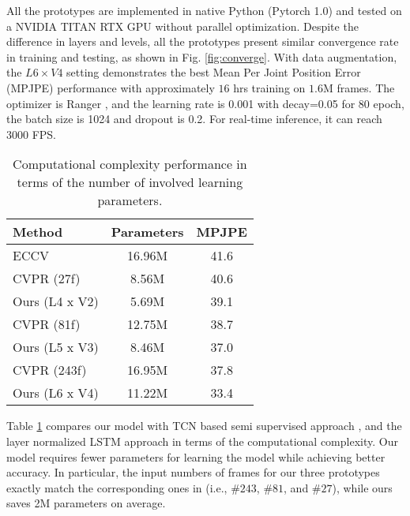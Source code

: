 \documentclass[twocolumn]{svjour3}          \smartqed  \usepackage{graphicx}
\begin{document}
All the prototypes are implemented in native Python (Pytorch 1.0) and tested on a NVIDIA TITAN RTX GPU  without parallel optimization. Despite the difference in layers and levels, all the prototypes present similar convergence rate in training and testing, as shown in Fig. \ref{fig:converge}. With data augmentation, the $L6\times V4$ setting demonstrates the best Mean Per Joint Position Error (MPJPE) performance with approximately $16$ hrs training on $1.6$M frames. The optimizer is Ranger \citep{zhang2019lookahead,liu2019variance}, and the learning rate is 0.001 with decay=0.05 for 80 epoch, the batch size is 1024 and dropout is 0.2. For real-time inference, it can reach $3000$ FPS. 

\begin{table}[ht]
	\begin{center}

			\begin{tabular}{l|c c}
				\toprule
				 Method & Parameters & MPJPE\\
				\midrule
ECCV
				\citep{Hossain2018} &16.96M & 41.6\\
CVPR
				\citep{Pavllo2019} (27f) & 8.56M & 40.6\\
				Ours (L4 x V2) & 5.69M & 39.1 \\
				\midrule
CVPR
				\citep{Pavllo2019} (81f) & 12.75M & 38.7\\
				Ours (L5 x V3) & 8.46M & 37.0\\
			    \midrule
CVPR
			    \citep{Pavllo2019} (243f) & 16.95M & 37.8\\
			    Ours (L6 x V4) & 11.22M & 33.4\\
				\bottomrule
			\end{tabular}
	\end{center}
	\caption{Computational complexity performance in terms of the number of involved learning parameters. }
	\label{tb:tb5}
\end{table}

Table \ref{tb:tb5} compares our model with TCN based  semi supervised approach \citep{Pavllo2019}, and the layer normalized LSTM approach \citep{Hossain2018} in terms of the computational complexity. Our model requires fewer parameters for learning the model while achieving better accuracy.  In particular, the input numbers of frames for our three prototypes exactly match the corresponding ones in \citep{Pavllo2019} (i.e., $\#243$, $\#81$, and $\#27$), while ours saves 2M parameters on average. 
\end{document}
